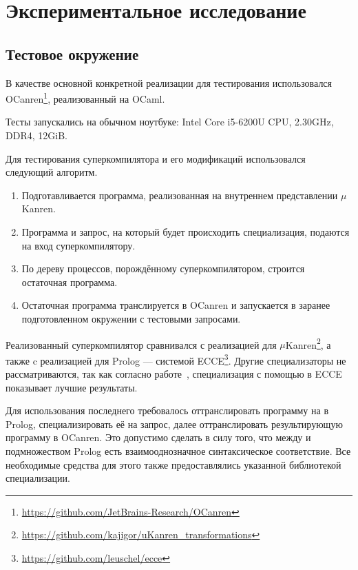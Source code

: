 \section{Экспериментальное исследование}
\label{sec:testing}

\subsection{Тестовое окружение}

В качестве основной конкретной реализации \ukanren для тестирования
использовался OCanren\footnote{\url{https://github.com/JetBrains-Research/OCanren}}\cite{ocanren},
реализованный на OCaml\cite{ocanren}.

Тесты запускались на обычном ноутбуке: Intel Core i5-6200U CPU, 2.30GHz, DDR4, 12GiB.

Для тестирования суперкомпилятора и его модификаций использовался следующий алгоритм.
\begin{enumerate}
\item Подготавливается программа, реализованная на внутреннем представлении $\mu$Kanren.
\item Программа и запрос, на который будет происходить специализация, подаются на вход суперкомпилятору.
\item По дереву процессов, порождённому суперкомпилятором, строится остаточная программа.
\item Остаточная программа транслируется в OCanren и
      запускается в заранее подготовленном окружении с тестовыми запросами.
\end{enumerate}


Реализованный суперкомпилятор сравнивался с реализацией \forcpd для $\mu$Kanren\footnote{\url{https://github.com/kajigor/uKanren_transformations}},
а также c реализацией \forcpd для Prolog --- системой ECCE\footnote{\url{https://github.com/leuschel/ecce}}.
Другие специализаторы не рассматриваются, так как согласно работе~\cite{controlPoly}, специализация с
помощью \forcpd в ECCE показывает лучшие результаты.

Для использования последнего требовалось оттранслировать программу на \ukanren в Prolog, специализировать
её на запрос, далее оттранслировать результирующую программу в OCanren.
Это допустимо сделать в силу того, что между \ukanren и подмножеством Prolog есть
взаимооднозначное синтаксическое соответствие. 
Все необходимые средства для этого также предоставлялись указанной библиотекой специализации.



